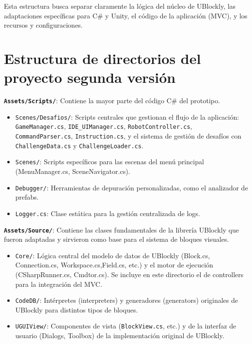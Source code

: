 Esta estructura busca separar claramente la lógica del núcleo de UBlockly, las adaptaciones específicas para C\# y Unity, el código de la aplicación (MVC), y los recursos y configuraciones.


\section{Estructura de directorios del proyecto segunda versión}

 \item \textbf{\texttt{Assets/Scripts/}}: Contiene la mayor parte del código C\# del prototipo.
\begin{itemize}
	\item \texttt{Scenes/Desafios/}: Scripts centrales que gestionan el flujo de la aplicación: \texttt{GameManager.cs}, \texttt{IDE\_UIManager.cs}, \texttt{RobotController.cs}, \texttt{CommandParser.cs}, \texttt{Instruction.cs}, y el sistema de gestión de desafíos con \texttt{ChallengeData.cs} y \texttt{ChallengeLoader.cs}.
	\item \texttt{Scenes/}: Scripts específicos para las escenas del menú principal (MenuManager.cs, SceneNavigator.cs).
	\item \texttt{Debugger/}: Herramientas de depuración personalizadas, como el analizador de prefabs.
	\item \texttt{Logger.cs}: Clase estática para la gestión centralizada de logs.
\end{itemize}

\item \textbf{\texttt{Assets/Source/}}: Contiene las clases fundamentales de la librería UBlockly que fueron adaptadas y sirvieron como base para el sistema de bloques visuales.
\begin{itemize}
	\item \texttt{Core/}: Lógica central del modelo de datos de UBlockly (Block.cs, Connection.cs, Workspace.cs,Field.cs, etc.) y el motor de ejecución (CSharpRunner.cs, Cmdtor.cs). Se incluye en este directorio el de controllers para la integración del MVC.
	\item \texttt{CodeDB/}: Intérpretes (interpreters) y generadores (generators) originales de UBlockly para distintos tipos de bloques.
	\item \texttt{UGUIView/}: Componentes de vista (\texttt{BlockView.cs}, etc.) y de la interfaz de usuario (Dialogs, Toolbox) de la implementación original de UBlockly.
\end{itemize}

